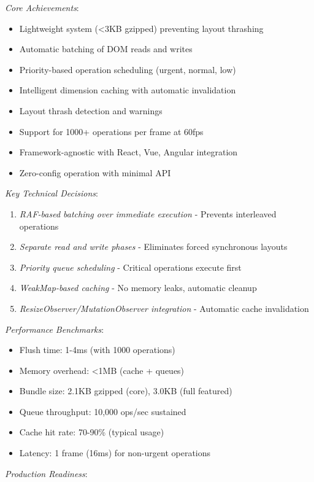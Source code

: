 \documentclass[11pt]{article}
\begin{document}
\emph{Core Achievements}:

\begin{itemize}
\item Lightweight system (<3KB gzipped) preventing layout thrashing
\item Automatic batching of DOM reads and writes
\item Priority-based operation scheduling (urgent, normal, low)
\item Intelligent dimension caching with automatic invalidation
\item Layout thrash detection and warnings
\item Support for 1000+ operations per frame at 60fps
\item Framework-agnostic with React, Vue, Angular integration
\item Zero-config operation with minimal API
\end{itemize}

\emph{Key Technical Decisions}:

\begin{enumerate}
\item \emph{RAF-based batching over immediate execution} - Prevents interleaved operations
\item \emph{Separate read and write phases} - Eliminates forced synchronous layouts
\item \emph{Priority queue scheduling} - Critical operations execute first
\item \emph{WeakMap-based caching} - No memory leaks, automatic cleanup
\item \emph{ResizeObserver/MutationObserver integration} - Automatic cache invalidation
\end{enumerate}

\emph{Performance Benchmarks}:

\begin{itemize}
\item Flush time: 1-4ms (with 1000 operations)
\item Memory overhead: <1MB (cache + queues)
\item Bundle size: 2.1KB gzipped (core), 3.0KB (full featured)
\item Queue throughput: 10,000 ops/sec sustained
\item Cache hit rate: 70-90\% (typical usage)
\item Latency: 1 frame (16ms) for non-urgent operations
\end{itemize}

\emph{Production Readiness}:
\end{document}
